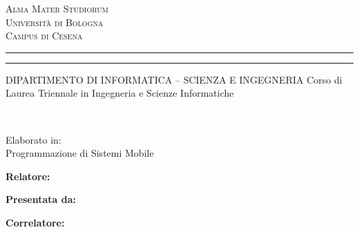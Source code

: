 
\oddsidemargin=25pt

\begin{titlepage}
\begin{center}
{{\Large{\textsc{Alma Mater Studiorum}}}\\
{\Large{\textsc{Universit\`a di Bologna}}} \\
{\textsc{Campus di Cesena}} \rule[0.1cm]{14cm}{0.1mm}
		\rule[0.5cm]{14cm}{0.6mm}
DIPARTIMENTO DI INFORMATICA – SCIENZA E INGEGNERIA
\color{red}Corso di Laurea Triennale in Ingegneria e Scienze Informatiche }
\end{center}
\vspace{15mm}
\begin{center}
\\
\end{center}
\vspace{15mm}
\begin{center}
 {\large{ Elaborato in:\\
\color{red}Programmazione di Sistemi Mobile\\}}   
\end{center}
\vspace{20mm}
\par
\noindent


\begin{minipage}[t]{0.47\textwidth}
{\large{\bf Relatore:\\
\color{red}\xsupervisor}}
\end{minipage}


\hfill
\begin{minipage}[t]{0.47\textwidth}\raggedleft
{\large{\bf Presentata da:\\
\color{red}\xstudent}}
\end{minipage}

\vspace{-8mm}

\begin{minipage}[t]{0.47\textwidth}
{\large{\bf Correlatore:\\
\color{red}\xcosupervisor}}
\end{minipage}



\vspace{20mm}

\begin{center}
\end{center}
\end{titlepage}
